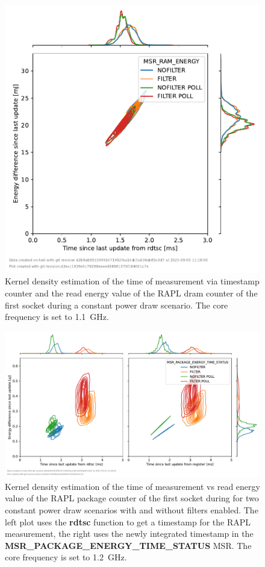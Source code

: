 \begin{figure}[]
    \centering
    \includegraphics[width=0.54\columnwidth]{fig/rapl-update-intervals/MSR_RAM_ENERGY_1100000.pdf}
    \caption{Kernel density estimation of the time of measurement via timestamp counter and the read energy value of the RAPL dram counter of the first socket during a constant power draw scenario.
    The core frequency is set to \SI{1.1}{\GHz}.}
\end{figure}

\clearpage
\begin{figure}[]
    \centering
    \includegraphics[width=\columnwidth]{fig/rapl-update-intervals/MSR_PACKAGE_ENERGY_TIME_STATUS_1200000.pdf}
    \caption{Kernel density estimation of the time of measurement vs read energy value of the RAPL package counter of the first socket during for two constant power draw scenarios with and without filters enabled.
    The left plot uses the \textbf{rdtsc} function to get a timestamp for the RAPL measurement, the right uses the newly integrated timestamp in the \textbf{MSR\_PACKAGE\_ENERGY\_TIME\_STATUS} MSR.
    The core frequency is set to \SI{1.2}{\GHz}.}
\end{figure}

